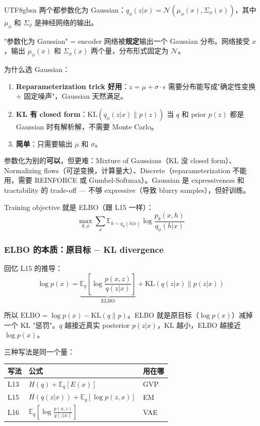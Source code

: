 \documentclass[11pt]{article}
\begin{document}
\begin{CJK}{UTF8}{gbsn}
两个都参数化为 Gaussian：$q_\phi(z|x) = \mathcal{N}(\mu_\phi(x), \Sigma_\phi(x))$，其中 $\mu_\phi$ 和 $\Sigma_\phi$ 是神经网络的输出。

"参数化为 Gaussian" = encoder 网络被\textbf{规定}输出一个 Gaussian 分布。网络接受 $x$，输出 $\mu_\phi(x)$ 和 $\Sigma_\phi(x)$ 两个量，分布形式固定为 $\mathcal{N}$。

为什么选 Gaussian：
\begin{enumerate}
  \item \textbf{Reparameterization trick 好用}：$z = \mu + \sigma \cdot \epsilon$ 需要分布能写成"确定性变换 + 固定噪声"，Gaussian 天然满足。
  \item \textbf{KL 有 closed form}：$\mathrm{KL}(q_\phi(z|x) \| p(z))$ 当 $q$ 和 prior $p(z)$ 都是 Gaussian 时有解析解，不需要 Monte Carlo。
  \item \textbf{简单}：只需要输出 $\mu$ 和 $\sigma$。
\end{enumerate}

参数化为别的\textbf{可以}，但更难：Mixture of Gaussians（KL 没 closed form）、Normalizing flows（可逆变换，计算量大）、Discrete（reparameterization 不能用，需要 REINFORCE 或 Gumbel-Softmax）。Gaussian 是 expressiveness 和 tractability 的 trade-off --- 不够 expressive（导致 blurry samples），但好训练。

Training objective 就是 ELBO（跟 L15 一样）：
\[
  \max_{\theta, \phi} \sum_x \mathbb{E}_{h \sim q_\phi(h|x)} \log \frac{p_\theta(x, h)}{q_\phi(h|x)}
\]

\subsubsection{ELBO 的本质：原目标 $-$ KL divergence}

回忆 L15 的推导：
\[
  \log p(x) = \underbrace{\mathbb{E}_q\!\left[\log \frac{p(x,z)}{q(z|x)}\right]}_{\text{ELBO}} + \mathrm{KL}(q(z|x) \| p(z|x))
\]

所以 $\text{ELBO} = \log p(x) - \mathrm{KL}(q \| p)$。ELBO 就是原目标（$\log p(x)$）减掉一个 KL "惩罚"。$q$ 越接近真实 posterior $p(z|x)$，KL 越小，ELBO 越接近 $\log p(x)$。

三种写法是同一个量：
\begin{center}
\begin{tabular}{l|l|l}
  写法 & 公式 & 用在哪 \\
  \hline
  L13 & $H(q) + \mathbb{E}_q[E(x)]$ & GVP \\
  L15 & $H(q(z|x)) + \mathbb{E}_q[\log p(z,x)]$ & EM \\
  L16 & $\mathbb{E}_q\!\left[\log \frac{p(x,z)}{q(z|x)}\right]$ & VAE \\
\end{tabular}
\end{center}


\end{CJK}
\end{document}
